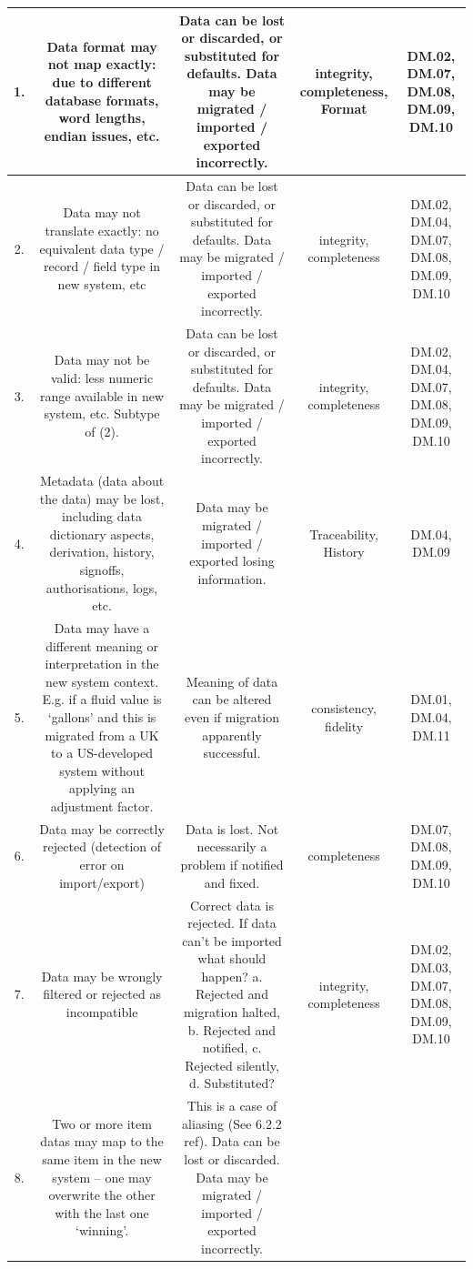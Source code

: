 \begin{longtable}{|C{}|C{}|C{}|C{}|C{}|}
1.&
Data format may not map exactly: due to different \gls{database} formats, word lengths, endian issues, etc.&
Data can be lost or discarded, or substituted for defaults. Data may be migrated / imported / exported incorrectly.&
\Gls{integrity}, \gls{completeness}, Format&
DM.02, DM.07, DM.08, DM.09, DM.10\\\hline
%
2.&
Data may not translate exactly: no equivalent data type / record / field type in new system, etc&
Data can be lost or discarded, or substituted for defaults. Data may be migrated / imported / exported incorrectly.&
\Gls{integrity}, \gls{completeness}&
DM.02, DM.04, DM.07, DM.08, DM.09, DM.10\\\hline
%
3.&
Data may not be valid: less numeric range available in new system, etc. Subtype of (2).&
Data can be lost or discarded, or substituted for defaults. Data may be migrated / imported / exported incorrectly.&
\Gls{integrity}, \gls{completeness}&
DM.02, DM.04, DM.07, DM.08, DM.09, DM.10\\\hline
%
4.&
Metadata (data about the data) may be lost, including \gls{data dictionary} aspects, derivation, history, signoffs, authorisations,
logs, etc.&
Data may be migrated / imported / exported losing \gls{information}.&
Traceability, History&
DM.04, DM.09\\\hline
%
5.&
Data may have a different meaning or interpretation in the new system context.
E.g. if a fluid value is ‘gallons’ and this is migrated from a UK to a US-developed system without applying an adjustment factor.&
Meaning of data can be altered even if migration apparently successful.&
\Gls{consistency}, \gls{fidelity}&
DM.01, DM.04, DM.11\\\hline
%
6.
&
Data may be correctly rejected (detection of error on import/export)&
Data is lost. Not necessarily a problem if notified and fixed.&
\Gls{completeness}&
DM.07, DM.08, DM.09, DM.10\\\hline
%
7.
&
Data may be wrongly filtered or rejected as incompatible&
Correct data is rejected. If data can’t be imported what should happen? a. Rejected and migration halted,
b. Rejected and notified, c. Rejected silently, d. Substituted?&
\Gls{integrity}, \gls{completeness}&
DM.02, DM.03, DM.07, DM.08, DM.09, DM.10\\\hline
%
8.&
Two or more \glspl{item data} may map to the same item in the new system – one may overwrite the other with the last one ‘winning’.&
This is a case of aliasing (See 6.2.2 ref). Data can be lost or discarded. Data may be migrated / imported / exported incorrectly.&

\end{longtable}
